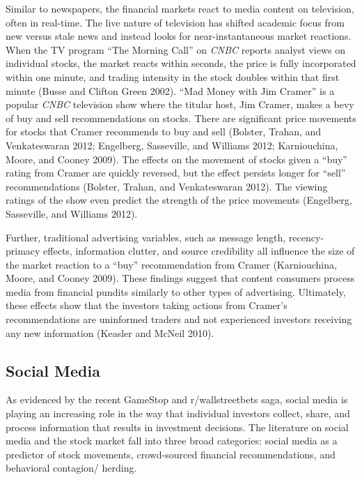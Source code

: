 \documentclass[12pt,]{article}
\begin{document}
Similar to newspapers, the financial markets react to media content on
television, often in real-time. The live nature of television has
shifted academic focus from new versus stale news and instead looks for
near-instantaneous market reactions. When the TV program ``The Morning
Call'' on \emph{CNBC} reports analyst views on individual stocks, the
market reacts within seconds, the price is fully incorporated within one
minute, and trading intensity in the stock doubles within that first
minute (Busse and Clifton Green 2002). ``Mad Money with Jim Cramer'' is
a popular \emph{CNBC} television show where the titular host, Jim
Cramer, makes a bevy of buy and sell recommendations on stocks. There
are significant price movements for stocks that Cramer recommends to buy
and sell (Bolster, Trahan, and Venkateswaran 2012; Engelberg,
Sasseville, and Williams 2012; Karniouchina, Moore, and Cooney 2009).
The effects on the movement of stocks given a ``buy'' rating from Cramer
are quickly reversed, but the effect persists longer for ``sell''
recommendations (Bolster, Trahan, and Venkateswaran 2012). The viewing
ratings of the show even predict the strength of the price movements
(Engelberg, Sasseville, and Williams 2012).

Further, traditional advertising variables, such as message length,
recency-primacy effects, information clutter, and source credibility all
influence the size of the market reaction to a ``buy'' recommendation
from Cramer (Karniouchina, Moore, and Cooney 2009). These findings
suggest that content consumers process media from financial pundits
similarly to other types of advertising. Ultimately, these effects show
that the investors taking actions from Cramer's recommendations are
uninformed traders and not experienced investors receiving any new
information (Keasler and McNeil 2010).

\hypertarget{social-media}{%
\subsection{Social Media}\label{social-media}}

As evidenced by the recent GameStop and r/wallstreetbets saga, social
media is playing an increasing role in the way that individual investors
collect, share, and process information that results in investment
decisions. The literature on social media and the stock market fall into
three broad categories: social media as a predictor of stock movements,
crowd-sourced financial recommendations, and behavioral contagion/
herding.
\end{document}
